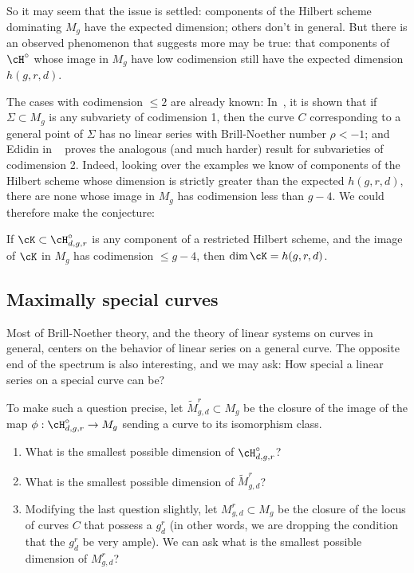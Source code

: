 So it may seem that the issue is settled: components of the Hilbert scheme dominating $M_g$ have the expected dimension; others don't in general. But there is an observed phenomenon that suggests more may be true: that components of $\cH^\circ$ whose image in $M_g$ have low codimension still have the expected dimension $h(g,r,d)$. 

The cases with codimension $\leq 2$ are already known: In~\cite{BrillNoether-1}, it is shown that if $\Sigma \subset M_g$ is any subvariety of codimension 1, then the curve $C$ corresponding to a general point of $\Sigma$ has no linear series with Brill-Noether number $\rho < -1$; and Edidin in ~\cite{Edidin} proves the analogous (and much harder) result for subvarieties of codimension 2. Indeed, looking over the examples we know of components of the Hilbert scheme whose dimension is strictly greater than the expected $h(g,r,d)$, there are none whose image in $M_g$ has codimension less than $g-4$. We could therefore make the conjecture:

\begin{conjecture}
If $\cK \subset \cH^\circ_{d,g,r}$ is any component of a restricted Hilbert scheme, and the image of $\cK$ in $M_g$ has codimension $\leq g-4$, then $\dim \cK = h(g,r,d)$.
\end{conjecture}

\subsection{Maximally special  curves} Most of Brill-Noether theory, and the theory of linear systems on curves in general, centers on the behavior of linear series on a general curve. The opposite end of the spectrum is also interesting, and we may ask: How special  a linear series on a special curve can be?

To make such a question precise, let $\tilde M^r_{g,d} \subset M_g$ be the closure of the image of the map $\phi : \cH^\circ_{d,g,r}\to M_g$ sending a curve to its isomorphism class. 
\begin{enumerate}
\item What is the smallest possible dimension of $\cH^\circ_{d,g,r}$? 
\item What is the smallest possible dimension of $\tilde M^r_{g,d}$?
\item Modifying the last question slightly, let $M^r_{g,d} \subset M_g$ be the closure of the locus of curves $C$ that possess a $g^r_d$ (in other words, we are dropping the condition that the $g^r_d$ be very ample). We can ask what is the smallest possible dimension of $M^r_{g,d}$?
\end{enumerate}

